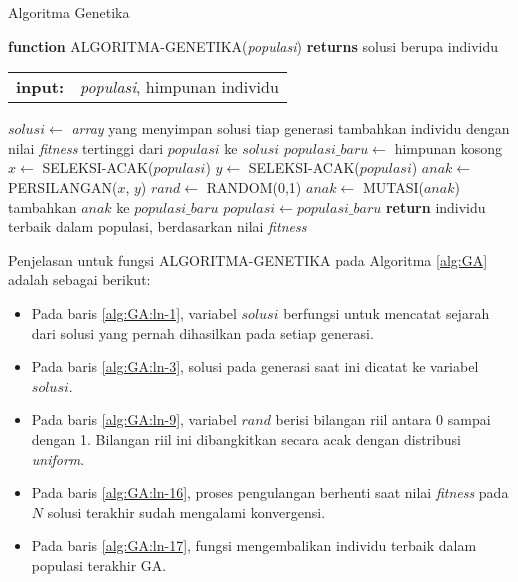 \begin{algorithm}[H]
	\caption{Algoritma Genetika \cite{russell2016artificial}}
	\label{alg:GA}
	\begin{flushleft}
		\textbf{function} ALGORITMA-GENETIKA(\textit{populasi}) \textbf{returns} solusi berupa individu
		\begin{flushleft}
			\begin{tabular}{ l l }
  				\textbf{input:} & \textit{populasi}, himpunan individu
			\end{tabular}
			\hspace{5pt}  
		\end{flushleft}
	\end{flushleft}
	\begin{algorithmic}[1]
		\STATE $solusi \leftarrow$ \textit{array} yang menyimpan solusi tiap generasi \label{alg:GA:ln-1}
		\REPEAT \label{alg:GA:ln-2}
			\STATE tambahkan individu dengan nilai \textit{fitness} tertinggi dari $populasi$ ke $solusi$ \label{alg:GA:ln-3}
			\STATE $populasi\_baru \leftarrow$ himpunan kosong \label{alg:GA:ln-4}
			 \label{alg:GA:ln-5}
				\STATE $x \leftarrow$ SELEKSI-ACAK($populasi$) \label{alg:GA:ln-6}
				\STATE $y \leftarrow$ SELEKSI-ACAK($populasi$) \label{alg:GA:ln-7}
				\STATE $anak \leftarrow$ PERSILANGAN($x$, $y$) \label{alg:GA:ln-8}
				\STATE $rand \leftarrow$ RANDOM(0,1) \label{alg:GA:ln-9}
				 \label{alg:GA:ln-10}
					\STATE $anak \leftarrow$ MUTASI($anak$) \label{alg:GA:ln-11}
				\ENDIF \label{alg:GA:ln-12}
				\STATE tambahkan $anak$ ke $populasi\_baru$ \label{alg:GA:ln-13}
			\ENDFOR \label{alg:GA:ln-14}
			\STATE $populasi \leftarrow populasi\_baru$ \label{alg:GA:ln-15}
		 \label{alg:GA:ln-16}
		\STATE \textbf{return} individu terbaik dalam populasi, berdasarkan nilai \textit{fitness} \label{alg:GA:ln-17}
	\end{algorithmic}
\end{algorithm}

Penjelasan untuk fungsi  ALGORITMA-GENETIKA pada Algoritma \ref{alg:GA} adalah sebagai berikut:
\begin{itemize}
	\item Pada baris \ref{alg:GA:ln-1}, variabel $solusi$ berfungsi untuk mencatat sejarah dari solusi yang pernah dihasilkan pada setiap generasi.
	\item Pada baris \ref{alg:GA:ln-3}, solusi pada generasi saat ini dicatat ke variabel $solusi$.
	\item Pada baris \ref{alg:GA:ln-9}, variabel $rand$ berisi bilangan riil antara 0 sampai dengan 1. Bilangan riil ini dibangkitkan secara acak dengan distribusi \textit{uniform}.
	\item Pada baris \ref{alg:GA:ln-16}, proses pengulangan berhenti saat nilai \textit{fitness} pada $N$ solusi terakhir sudah mengalami konvergensi.
	\item Pada baris \ref{alg:GA:ln-17}, fungsi mengembalikan individu terbaik dalam populasi terakhir GA.
\end{itemize}

